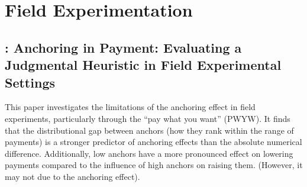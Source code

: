 \documentclass[11pt]{elegantbook}
\begin{document}
\chapter{Field Experimentation}

\section{\cite{jung2016anchoring}: Anchoring in Payment: Evaluating a Judgmental Heuristic in Field Experimental Settings}
This paper investigates the limitations of the anchoring effect in field experiments, particularly through the “pay what you want” (PWYW). It finds that the distributional gap between anchors (how they rank within the range of payments) is a stronger predictor of anchoring effects than the absolute numerical difference. Additionally, low anchors have a more pronounced effect on lowering payments compared to the influence of high anchors on raising them. (However, it may not due to the anchoring effect).


































































\end{document}
